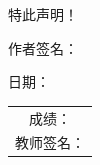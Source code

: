\documentclass[12pt,a4paper]{article}
\begin{document}
\noindent 特此声明！

\vspace{3cm}

\noindent 作者签名：\hrulefill

\vspace{1cm}

\noindent 日期：\hrulefill

\vspace{2cm}

\begin{flushright}
    \begin{tabular}{c}
        成绩：\hrulefill \\[1.5em]
        教师签名：\hrulefill
    \end{tabular}
\end{flushright}

\newpage

\newpage
\printbibliography
\end{document}
